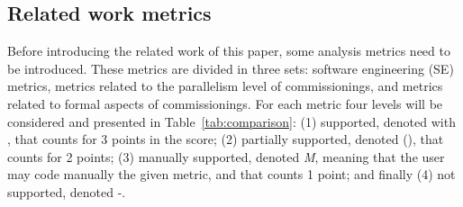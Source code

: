 
\subsection{Related work metrics}

Before introducing the related work of this paper, some analysis
metrics need to be introduced. These metrics are divided in three
sets: software engineering (SE) metrics, metrics related to the
parallelism level of commissionings, and metrics related to formal
aspects of commissionings. For each metric four levels will be
considered and presented in Table~\ref{tab:comparison}: (1) supported,
denoted with \checkmark, that counts for 3 points in the score; (2)
partially supported, denoted (\checkmark), that counts for 2 points;
(3) manually supported, denoted \emph{M}, meaning that the user may
code manually the given metric, and that counts 1 point; and finally
(4) not supported, denoted -.

